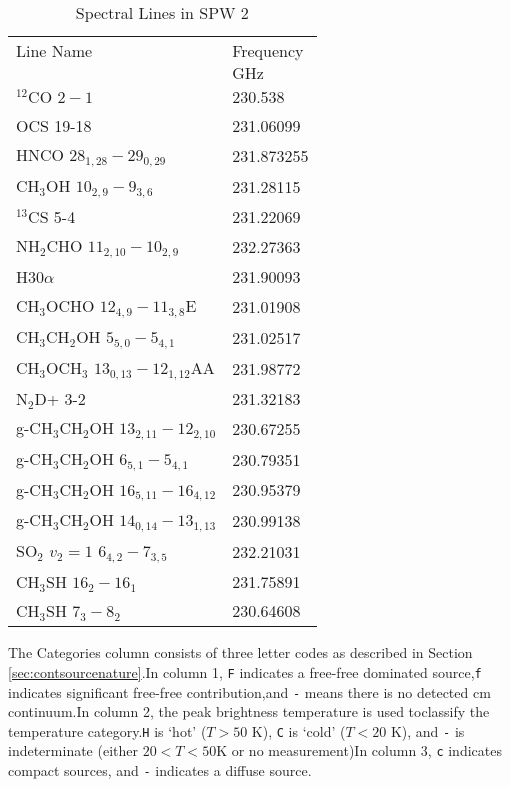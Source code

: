 \begin{table*}[htp]
\caption{Spectral Lines in SPW 2}
\begin{tabular}{ll}
\label{tab:linesspw2}
Line Name & Frequency \\
 & $\mathrm{GHz}$ \\
\hline
$^{12}$CO $2-1$ & 230.538 \\
OCS 19-18 & 231.06099 \\
HNCO $28_{1,28}-29_{0,29}$ & 231.873255 \\
CH$_3$OH $10_{2,9}-9_{3,6}$ & 231.28115 \\
$^{13}$CS 5-4 & 231.22069 \\
NH$_2$CHO $11_{2,10}-10_{2,9}$ & 232.27363 \\
H30$\alpha$ & 231.90093 \\
CH$_3$OCHO $12_{4,9}-11_{3,8}$E & 231.01908 \\
CH$_3$CH$_2$OH $5_{5,0}-5_{4,1}$ & 231.02517 \\
CH$_3$OCH$_3$ $13_{0,13}-12_{1,12}$AA & 231.98772 \\
N$_2$D+ 3-2 & 231.32183 \\
g-CH$_3$CH$_2$OH $13_{2,11}-12_{2,10}$ & 230.67255 \\
g-CH$_3$CH$_2$OH $6_{5,1}-5_{4,1}$ & 230.79351 \\
g-CH$_3$CH$_2$OH $16_{5,11}-16_{4,12}$ & 230.95379 \\
g-CH$_3$CH$_2$OH $14_{0,14}-13_{1,13}$ & 230.99138 \\
SO$_2$ $v_2=1$ $6_{4,2}-7_{3,5}$ & 232.21031 \\
CH$_3$SH $16_2-16_1$ & 231.75891 \\
CH$_3$SH $7_3-8_2$ & 230.64608 \\
\hline
\end{tabular}
\par
The Categories column consists of three letter codes as described in Section \ref{sec:contsourcenature}.In column 1, \texttt{F} indicates a free-free dominated source,\texttt{f} indicates significant free-free contribution,and \texttt{-} means there is no detected cm continuum.In column 2, the peak brightness temperature is used toclassify the temperature category.\texttt{H} is `hot' ($T>50$ K), \texttt{C} is `cold' ($T<20$ K), and \texttt{-} is indeterminate (either $20<T<50$K or no measurement)In column 3, \texttt{c} indicates compact sources, and \texttt{-} indicates a diffuse source.
\end{table*}
